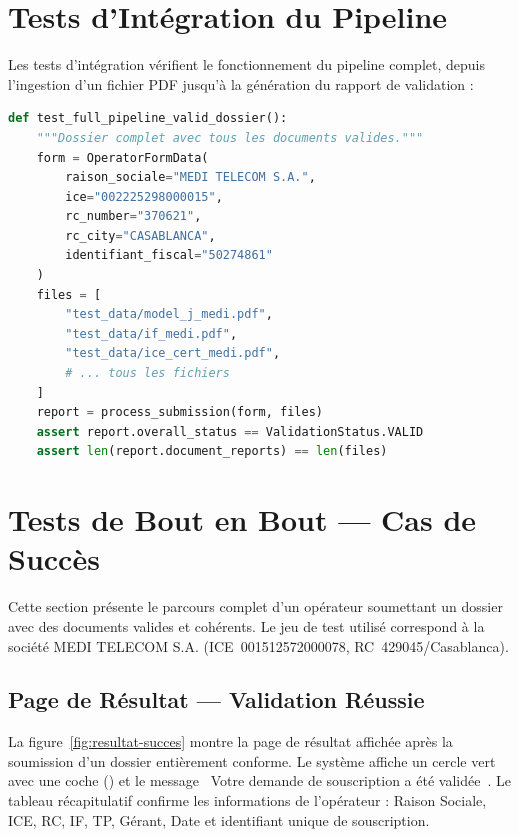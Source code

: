 \section{Tests d'Int\'{e}gration du Pipeline}

Les tests d'int\'{e}gration v\'{e}rifient le fonctionnement du pipeline complet, depuis l'ingestion d'un fichier PDF jusqu'\`{a} la g\'{e}n\'{e}ration du rapport de validation :

\begin{lstlisting}[language=Python, caption={Test d'int\'{e}gration du pipeline (test\_pipeline.py).}, label={lst:test-pipeline}]
def test_full_pipeline_valid_dossier():
    """Dossier complet avec tous les documents valides."""
    form = OperatorFormData(
        raison_sociale="MEDI TELECOM S.A.",
        ice="002225298000015",
        rc_number="370621",
        rc_city="CASABLANCA",
        identifiant_fiscal="50274861"
    )
    files = [
        "test_data/model_j_medi.pdf",
        "test_data/if_medi.pdf",
        "test_data/ice_cert_medi.pdf",
        # ... tous les fichiers
    ]
    report = process_submission(form, files)
    assert report.overall_status == ValidationStatus.VALID
    assert len(report.document_reports) == len(files)
\end{lstlisting}

\section{Tests de Bout en Bout --- Cas de Succ\`{e}s}

Cette section pr\'{e}sente le parcours complet d'un op\'{e}rateur soumettant un dossier avec des documents valides et coh\'{e}rents. Le jeu de test utilis\'{e} correspond \`{a} la soci\'{e}t\'{e} MEDI TELECOM S.A. (ICE~001512572000078, RC~429045/Casablanca).

\subsection{Page de R\'{e}sultat --- Validation R\'{e}ussie}

La figure~\ref{fig:resultat-succes} montre la page de r\'{e}sultat affich\'{e}e apr\`{e}s la soumission d'un dossier enti\`{e}rement conforme. Le syst\`{e}me affiche un cercle vert avec une coche (\checkmark) et le message \guillemotleft~Votre demande de souscription a \'{e}t\'{e} valid\'{e}e~\guillemotright. Le tableau r\'{e}capitulatif confirme les informations de l'op\'{e}rateur : Raison Sociale, ICE, RC, IF, TP, G\'{e}rant, Date et identifiant unique de souscription.

